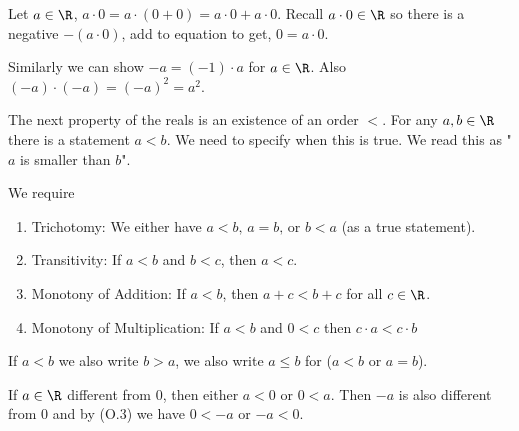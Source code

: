 \documentclass[10pt, a4paper]{article}
\begin{document}
Let $a \in \R$, $a \cdot 0 = a \cdot (0 + 0) = a \cdot 0 + a \cdot 0$. Recall $a \cdot 0 \in \R$ so there is a negative $-(a \cdot 0)$, add to equation to get, $0 = a \cdot 0$.

Similarly we can show $-a = (-1) \cdot a$ for $a \in \R$. Also $(-a) \cdot (-a) = (-a) ^ 2 = a ^ 2$.


The next property of the reals is an existence of an order $<$. For any $a, b \in \R$ there is a statement $a < b$. We need to specify when this is true. We read this as "$a$ is smaller than $b$".

We require
\begin{enumerate}[label = (O.\arabic*)]
    \item Trichotomy\label{analy:axiom:trichotomy}: We either have $a < b,\, a = b,\,\text{or } b < a$ (as a true statement).
    \item Transitivity: If $a < b$ and $b < c$, then $a < c$.
    \item Monotony of Addition: If $a < b$, then $a + c < b + c$ for all $c \in \R$.
    \item Monotony of Multiplication: If $a < b$ and $0 < c$ then $c \cdot a < c \cdot b$
\end{enumerate}
If $a < b$ we also write $b > a$, we also write $a \leq b$ for ($a < b$ or $a = b$).

If $a \in \R$ different from $0$, then either $a < 0$ or $0 < a$. Then $-a$ is also different from $0$ and by   (O.3) we have $0 < -a$ or $-a < 0$.
\end{document}

